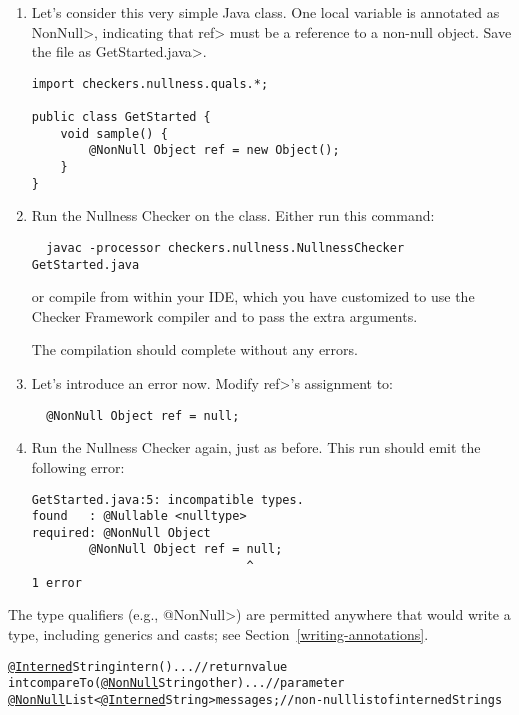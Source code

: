 \begin{enumerate}
\item
  Let's consider this very simple Java class.  One local variable is
  annotated as \<NonNull>, indicating that \<ref> must be a reference to a
  non-null object.  Save the file as \<GetStarted.java>.

\begin{Verbatim}
import checkers.nullness.quals.*;

public class GetStarted {
    void sample() {
        @NonNull Object ref = new Object();
    }
}
\end{Verbatim}

\item
  Run the Nullness Checker on the class.
  Either run this command:
\begin{Verbatim}
  javac -processor checkers.nullness.NullnessChecker GetStarted.java
\end{Verbatim}

\noindent
or compile from within your IDE, which you have customized to use the
Checker Framework compiler and to pass the extra arguments.

  The compilation should complete without any errors.

\item
  Let's introduce an error now.  Modify \<ref>'s assignment to:
\begin{Verbatim}
  @NonNull Object ref = null;
\end{Verbatim}

\item
  Run the Nullness Checker again, just as before.  This run should emit
  the following error:
\begin{Verbatim}
GetStarted.java:5: incompatible types.
found   : @Nullable <nulltype>
required: @NonNull Object
        @NonNull Object ref = null;
                              ^
1 error
\end{Verbatim}

\end{enumerate}

The type qualifiers (e.g., \<@NonNull>) are permitted anywhere
that would write a type, including generics and casts; see
Section~\ref{writing-annotations}.

\begin{alltt}
  \underline{@Interned} String intern() \ttlcb{} ... \ttrcb{}             // return value
  int compareTo(\underline{@NonNull} String other) \ttlcb{} ... \ttrcb{}  // parameter
  \underline{@NonNull} List<\underline{@Interned} String> messages;     // non-null list of interned Strings
\end{alltt}


